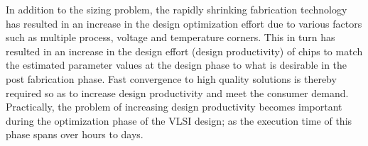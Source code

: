\noindent In addition to the sizing problem, the rapidly shrinking fabrication technology has resulted in an increase in the design optimization effort due to various factors such as multiple process, voltage and temperature corners. This in turn has resulted in an increase in the design effort (design productivity) of chips to match the estimated parameter values at the design phase to what is desirable in the  post fabrication phase. Fast convergence to high quality solutions is thereby required so as to increase design productivity and meet the consumer demand. Practically, the problem of increasing design productivity becomes important during the optimization phase of the VLSI design; as the execution time of this phase spans over hours to days. %
% 
% 

